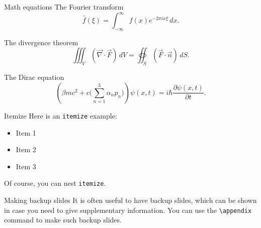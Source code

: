 \documentclass[14pt]{beamer}
\begin{document}
\begin{frame}{Math equations}
  The Fourier transform
  \begin{equation}
    \hat{f}(\xi) = \int_{-\infty}^\infty
      f(x) e^{-2\pi ix\xi} \, dx .
  \end{equation}

  \pause

  The divergence theorem
  \begin{equation}
    \iiint_V (\vec{\nabla}\cdot\vec{F}) \, dV
      = \oiint_S (\vec{F}\cdot\vec{n}) \, dS .
  \end{equation}

  \pause

  The Dirac equation
  \begin{equation}
    \left( \beta mc^2 + c \Biggl( \sum_{n=1}^3 \alpha_n p_n \Biggr) \right)
      \psi(x, t) = i \hbar \frac{\partial \psi(x, t)}{\partial t} .
  \end{equation}
\end{frame}

\begin{frame}{Itemize}
  Here is an \texttt{itemize} example:
  \pause
  \begin{itemize}
    \item Item 1
    \pause
    \item Item 2
    \pause
    \item Item 3
  \end{itemize}
  \pause
  Of course, you can nest \texttt{itemize}.
\end{frame}

\appendix

\begin{frame}[fragile]{Making backup slides}
  It is often useful to have backup slides, which can be shown in case you need
  to give supplementary information. You can use the \verb|\appendix| command
  to make such backup slides.
\end{frame}
\end{document}
